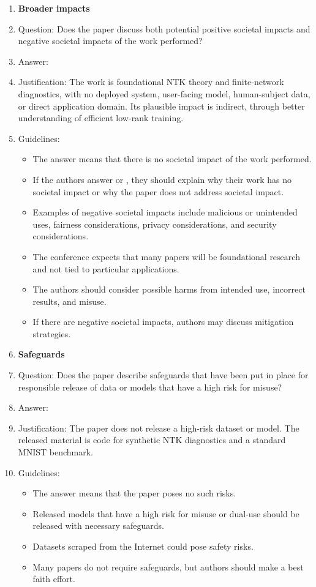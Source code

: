 \documentclass{article}
\begin{document}
\begin{enumerate}[leftmargin=1.5em]
\item {\bf Broader impacts}
    \item[] Question: Does the paper discuss both potential positive societal impacts and negative societal impacts of the work performed?
    \item[] Answer: \answerNA{}
    \item[] Justification: The work is foundational NTK theory and finite-network diagnostics, with no deployed system, user-facing model, human-subject data, or direct application domain. Its plausible impact is indirect, through better understanding of efficient low-rank training.
    \item[] Guidelines:
    \begin{itemize}
        \item The answer \answerNA{} means that there is no societal impact of the work performed.
        \item If the authors answer \answerNA{} or \answerNo{}, they should explain why their work has no societal impact or why the paper does not address societal impact.
        \item Examples of negative societal impacts include malicious or unintended uses, fairness considerations, privacy considerations, and security considerations.
        \item The conference expects that many papers will be foundational research and not tied to particular applications.
        \item The authors should consider possible harms from intended use, incorrect results, and misuse.
        \item If there are negative societal impacts, authors may discuss mitigation strategies.
    \end{itemize}

\item {\bf Safeguards}
    \item[] Question: Does the paper describe safeguards that have been put in place for responsible release of data or models that have a high risk for misuse?
    \item[] Answer: \answerNA{}
    \item[] Justification: The paper does not release a high-risk dataset or model. The released material is code for synthetic NTK diagnostics and a standard MNIST benchmark.
    \item[] Guidelines:
    \begin{itemize}
        \item The answer \answerNA{} means that the paper poses no such risks.
        \item Released models that have a high risk for misuse or dual-use should be released with necessary safeguards.
        \item Datasets scraped from the Internet could pose safety risks.
        \item Many papers do not require safeguards, but authors should make a best faith effort.
    \end{itemize}


\end{enumerate}
\end{document}
